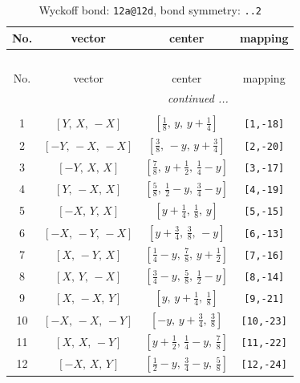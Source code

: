 \documentclass[fleqn,8pt]{jsarticle}
\begin{document}
\begin{longtable}{cccc}
\caption{Wyckoff bond: {\tt 12a@12d}, bond symmetry: {\tt ..2}}
 \\
 \hline \hline
No. & vector & center & mapping \\ \hline \endfirsthead

\multicolumn{3}{l}{\tablename\ \thetable{}} \\
 \hline \hline
No. & vector & center & mapping \\ \hline \endhead

 \hline \hline
\multicolumn{3}{r}{\footnotesize\it continued ...} \\ \endfoot

 \hline \hline
\multicolumn{3}{r}{} \\ \endlastfoot

1 & $\left[ Y,\, X,\, - X \right]$ & $\left[ \frac{1}{8},\, y,\, y + \frac{1}{4} \right]$ & {\tt [1,-18]} \\ \hline
2 & $\left[ - Y,\, - X,\, - X \right]$ & $\left[ \frac{3}{8},\, - y,\, y + \frac{3}{4} \right]$ & {\tt [2,-20]} \\ \hline
3 & $\left[ - Y,\, X,\, X \right]$ & $\left[ \frac{7}{8},\, y + \frac{1}{2},\, \frac{1}{4} - y \right]$ & {\tt [3,-17]} \\ \hline
4 & $\left[ Y,\, - X,\, X \right]$ & $\left[ \frac{5}{8},\, \frac{1}{2} - y,\, \frac{3}{4} - y \right]$ & {\tt [4,-19]} \\ \hline
5 & $\left[ - X,\, Y,\, X \right]$ & $\left[ y + \frac{1}{4},\, \frac{1}{8},\, y \right]$ & {\tt [5,-15]} \\ \hline
6 & $\left[ - X,\, - Y,\, - X \right]$ & $\left[ y + \frac{3}{4},\, \frac{3}{8},\, - y \right]$ & {\tt [6,-13]} \\ \hline
7 & $\left[ X,\, - Y,\, X \right]$ & $\left[ \frac{1}{4} - y,\, \frac{7}{8},\, y + \frac{1}{2} \right]$ & {\tt [7,-16]} \\ \hline
8 & $\left[ X,\, Y,\, - X \right]$ & $\left[ \frac{3}{4} - y,\, \frac{5}{8},\, \frac{1}{2} - y \right]$ & {\tt [8,-14]} \\ \hline
9 & $\left[ X,\, - X,\, Y \right]$ & $\left[ y,\, y + \frac{1}{4},\, \frac{1}{8} \right]$ & {\tt [9,-21]} \\ \hline
10 & $\left[ - X,\, - X,\, - Y \right]$ & $\left[ - y,\, y + \frac{3}{4},\, \frac{3}{8} \right]$ & {\tt [10,-23]} \\ \hline
11 & $\left[ X,\, X,\, - Y \right]$ & $\left[ y + \frac{1}{2},\, \frac{1}{4} - y,\, \frac{7}{8} \right]$ & {\tt [11,-22]} \\ \hline
12 & $\left[ - X,\, X,\, Y \right]$ & $\left[ \frac{1}{2} - y,\, \frac{3}{4} - y,\, \frac{5}{8} \right]$ & {\tt [12,-24]} \\
\end{longtable}
\end{document}
